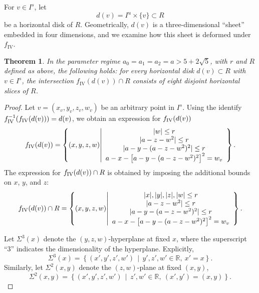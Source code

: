 \documentclass[12pt]{iopart}
\newtheorem{theorem}{Theorem}[section]
\begin{document}
For \(v \in I^s\), let  
\[
d(v) = I^u \times \{ v \} \subset R
\]  
be a horizontal disk of \(R\).  
Geometrically, \(d(v)\) is a three-dimensional ``sheet'' embedded in four dimensions, and we examine how this sheet is deformed under \( f_{\mathrm{IV}} \).

\begin{theorem}\label{4D triply folded horseshoe topology}
In the parameter regime $a_0 = a_1 = a_2 = a > 5 + 2\sqrt{5}$, with $r$ and $R$ defined as above, the following holds: for every horizontal disk \( d(v) \subset R \) with \( v \in I^s \), the intersection \( f_{\mathrm{IV}}(d(v)) \cap R \) consists of eight disjoint horizontal slices of \( R \).
\end{theorem}

\begin{proof}
Let $v=(x_v,y_v,z_v,w_v)$ be an arbitrary point in $I^s$. Using the identify $f^{-1}_{\rm IV}(f_{\rm IV}(d(v)))=d(v)$, we obtain an expression for $f_{\rm IV}(d(v))$
\begin{equation}\label{eq:f IV V}
f_{\rm IV}(d(v)) = 
\left\lbrace (x,y,z,w) \middle| \begin{array}{ccc}
|w| \leq r \\
| a - z - w^2 | \leq r \\
| a - y - (a - z - w^2)^2 | \leq r \\
a - x - \left[ a - y - (a - z - w^2)^2 \right]^2  = w_v \end{array} \right\rbrace. 
\end{equation}
The expression for $f_{\rm IV}(d(v))\cap R$ is obtained by imposing the additional bounds on $x$, $y$, and $z$:
\begin{equation}\label{eq:V intersect f IV V}
f_{\rm IV}(d(v))\cap R = 
\left\lbrace (x,y,z,w) \middle| \begin{array}{ccc}
|x|,|y|,|z|,|w| \leq r \\
| a - z - w^2 | \leq r \\
| a - y - (a - z - w^2)^2 | \leq r \\
a - x - \left[ a - y - (a - z - w^2)^2 \right]^2  = w_v \end{array} \right\rbrace. 
\end{equation}

Let \(\Sigma^3(x)\) denote the \((y,z,w)\)-hyperplane at fixed \(x\), where the superscript “3” indicates the dimensionality of the hyperplane. Explicitly,  
\begin{equation}\label{eq: y z w slice for f_IV}
\Sigma^3(x) = \left\lbrace (x',y',z',w') \,\middle|\, y',z',w' \in \mathbb{R},\ x' = x \right\rbrace.
\end{equation}
Similarly, let \(\Sigma^2(x,y)\) denote the \((z,w)\)-plane at fixed \( (x,y) \),  
\begin{equation}\label{eq: z w slice for f_IV}
\Sigma^2(x,y) = \left\lbrace (x',y',z',w') \,\middle|\, z',w' \in \mathbb{R},\ (x',y') = (x,y) \right\rbrace.
\end{equation}


\end{proof}
\end{document}
